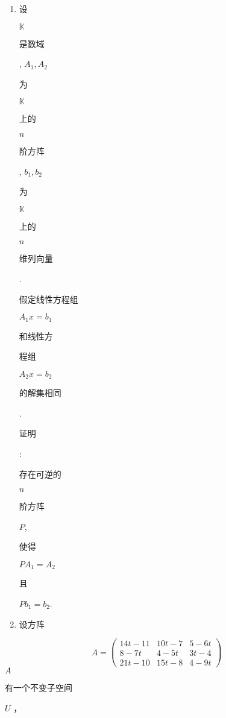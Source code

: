 \documentclass[10pt]{article}
\begin{document}
\begin{enumerate}
  \item \begin{CJK}{UTF8}{mj}设\end{CJK} $\mathbb{K}$ \begin{CJK}{UTF8}{mj}是数域\end{CJK}, $A_{1}, A_{2}$ \begin{CJK}{UTF8}{mj}为\end{CJK} $\mathbb{K}$ \begin{CJK}{UTF8}{mj}上的\end{CJK} $n$ \begin{CJK}{UTF8}{mj}阶方阵\end{CJK}, $b_{1}, b_{2}$ \begin{CJK}{UTF8}{mj}为\end{CJK} $\mathbb{K}$ \begin{CJK}{UTF8}{mj}上的\end{CJK} $n$ \begin{CJK}{UTF8}{mj}维列向量\end{CJK}. \begin{CJK}{UTF8}{mj}假定线性方程组\end{CJK} $A_{1} x=b_{1}$ \begin{CJK}{UTF8}{mj}和线性方\end{CJK} \begin{CJK}{UTF8}{mj}程组\end{CJK} $A_{2} x=b_{2}$ \begin{CJK}{UTF8}{mj}的解集相同\end{CJK}. \begin{CJK}{UTF8}{mj}证明\end{CJK}: \begin{CJK}{UTF8}{mj}存在可逆的\end{CJK} $n$ \begin{CJK}{UTF8}{mj}阶方阵\end{CJK} $P$, \begin{CJK}{UTF8}{mj}使得\end{CJK} $P A_{1}=A_{2}$ \begin{CJK}{UTF8}{mj}且\end{CJK} $P b_{1}=b_{2}$.

  \item \begin{CJK}{UTF8}{mj}设方阵\end{CJK}

\end{enumerate}
$$
A=\left(\begin{array}{ccc}
14 t-11 & 10 t-7 & 5-6 t \\
8-7 t & 4-5 t & 3 t-4 \\
21 t-10 & 15 t-8 & 4-9 t
\end{array}\right)
$$
$A$ \begin{CJK}{UTF8}{mj}有一个不变子空间\end{CJK} $U$ ，
\end{document}

